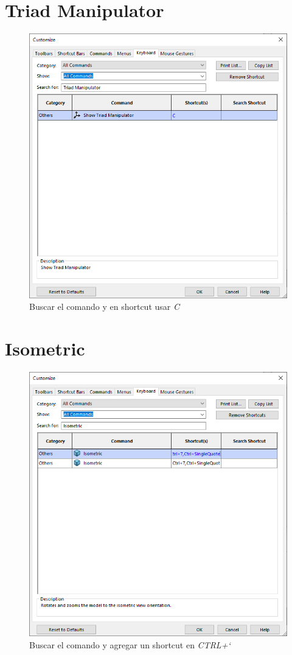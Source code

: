 \documentclass[12pt,letterpaper,final]{report}
\begin{document}
\section{Triad Manipulator}

\begin{figure}[H]
	\centering
	\includegraphics[width=0.85\linewidth, height=0.65\textheight,keepaspectratio]{Imagenes/solidworks_keyboard_03}
	\caption{Buscar el comando y en shortcut usar \emph{C}}
	\label{fig:solidworkskeyboard03}
\end{figure}

\section{Isometric}

\begin{figure}[H]
	\centering
	\includegraphics[width=0.85\linewidth, height=0.65\textheight,keepaspectratio]{Imagenes/solidworks_keyboard_04}
	\caption{Buscar el comando y agregar un shortcut en \emph{CTRL+`}}
	\label{fig:solidworkskeyboard04}
\end{figure}
\end{document}
